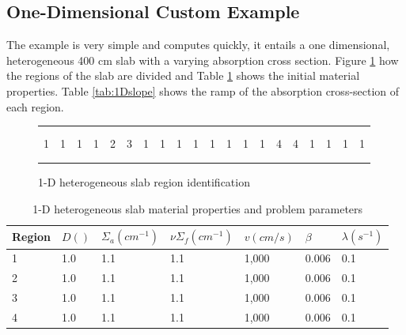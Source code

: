 \documentclass[12pt]{article}
\begin{document}
\subsection{One-Dimensional Custom Example}

The example is very simple and computes quickly, it entails a one dimensional, heterogeneous 400 cm slab with a varying absorption cross section.   Figure \ref{fig:slab} how the regions of the slab are divided and Table \ref{tab:1Dmat} shows the initial material properties.  Table \ref{tab:1Dslope} shows the ramp of the absorption cross-section of each region.

\begin{figure}[!htbp]
\begin{center}
\begin{tabular}{| l | l | l | l | l | l | l | l | l | l | l | l | l | l | l | l | l | l | l | l |}
\hline \hline \hline
  &   &   &   &   &   &    &    &   &   &   &   &   &   &   &   &   &   &   &   \\
  &   &   &   &   &   &    &    &   &   &   &   &   &   &   &   &   &   &   &   \\
1 & 1 & 1 & 1 & 2 & 3 & 1 & 1 & 1 & 1 & 1 & 1 & 1 & 1 & 4 & 4 & 1 & 1 & 1 & 1 \\
  &   &   &   &   &   &    &    &   &   &   &   &   &   &   &   &   &   &   &   \\
  &   &   &   &   &   &    &    &   &   &   &   &   &   &   &   &   &   &   &   \\
\hline \hline \hline
\end{tabular}
\caption{1-D heterogeneous slab region identification}
\label{fig:slab}
\end{center}
\end{figure}

\begin{table}[!htbp]
\begin{center}
\begin{tabular}{lllllll}
\toprule
Region & $D ()$ & $\Sigma_a (cm^{-1})$ & $\nu \Sigma_f (cm^{-1})$ & $v (cm/s)$ & $\beta$ & $\lambda (s^{-1})$ \\
\midrule
1 & 1.0 & 1.1 & 1.1 & 1,000 & 0.006 & 0.1 \\
2 & 1.0 & 1.1 & 1.1 & 1,000 & 0.006 & 0.1 \\
3 & 1.0 & 1.1 & 1.1 & 1,000 & 0.006 & 0.1 \\
4 & 1.0 & 1.1 & 1.1 & 1,000 & 0.006 & 0.1 \\
\bottomrule
\end{tabular}
\end{center}
\caption{1-D heterogeneous slab material properties and problem parameters}
\label{tab:1Dmat}
\end{table}
\end{document}
